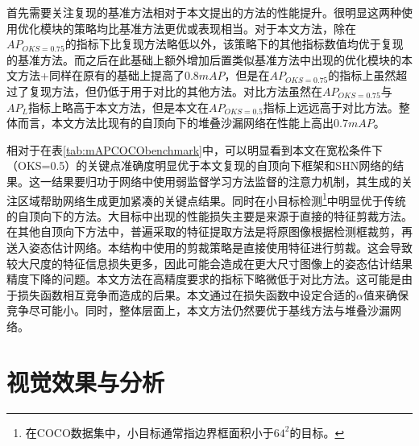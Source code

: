 首先需要关注复现的基准方法相对于本文提出的方法的性能提升。很明显这两种使用优化模块的策略均比基准方法更优或表现相当。对于本文方法，除在$AP_{OKS=0.75}$的指标下比复现方法略低以外，该策略下的其他指标数值均优于复现的基准方法。而之后在此基础上额外增加后置类似基准方法中出现的优化模块的本文方法+同样在原有的基础上提高了$0.8mAP$，但是在$AP_{OKS=0.75}$的指标上虽然超过了复现方法，但仍低于用于对比的其他方法。对比方法虽然在$AP_{OKS=0.75}$与$AP_L$指标上略高于本文方法，但是本文在$AP_{OKS=0.5}$指标上远远高于对比方法。整体而言，本文方法比现有的自顶向下的堆叠沙漏网络在性能上高出$0.7mAP$。

相对于在表\ref{tab:mAPCOCObenchmark}中，可以明显看到本文在宽松条件下（OKS=0.5）的关键点准确度明显优于本文复现的自顶向下框架和SHN网络的结果。这一结果要归功于网络中使用弱监督学习方法监督的注意力机制，其生成的关注区域帮助网络生成更加紧凑的关键点结果。同时在小目标检测\footnote{在COCO数据集中，小目标通常指边界框面积小于$64^2$的目标。}中明显优于传统的自顶向下的方法。大目标中出现的性能损失主要是来源于直接的特征剪裁方法。在其他自顶向下方法中，普遍采取的特征提取方法是将原图像根据检测框裁剪，再送入姿态估计网络。本结构中使用的剪裁策略是直接使用特征进行剪裁。这会导致较大尺度的特征信息损失更多，因此可能会造成在更大尺寸图像上的姿态估计结果精度下降的问题。本文方法在高精度要求的指标下略微低于对比方法。这可能是由于损失函数相互竞争而造成的后果。本文通过在损失函数中设定合适的$\alpha$值来确保竞争尽可能小。同时，整体层面上，本文方法仍然要优于基线方法与堆叠沙漏网络。


\section{视觉效果与分析}
\label{sec:demo}

